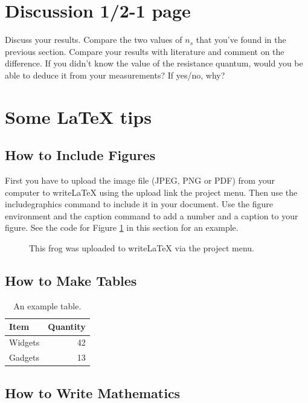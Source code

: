 \documentclass[a4paper]{article}
\begin{document}
\section{Discussion 1/2-1 page}
Discuss your results. Compare the two values of $n_{s}$ that you've found in the previous section. Compare your results with literature and comment on the difference. If you didn't know the value of the resistance quantum, would you be able to deduce it from your measurements? If yes/no, why?

\newpage
\section{Some LaTeX tips}
\label{sec:latex}
\subsection{How to Include Figures}

First you have to upload the image file (JPEG, PNG or PDF) from your computer to writeLaTeX using the upload link the project menu. Then use the includegraphics command to include it in your document. Use the figure environment and the caption command to add a number and a caption to your figure. See the code for Figure \ref{fig:frog} in this section for an example.

\begin{figure}
\centering
\caption{\label{fig:frog}This frog was uploaded to writeLaTeX via the project menu.}
\end{figure}

\subsection{How to Make Tables}


\begin{table}
\centering
\begin{tabular}{l|r}
Item & Quantity \\\hline
Widgets & 42 \\
Gadgets & 13
\end{tabular}
\caption{\label{tab:widgets}An example table.}
\end{table}

\subsection{How to Write Mathematics}
\end{document}
